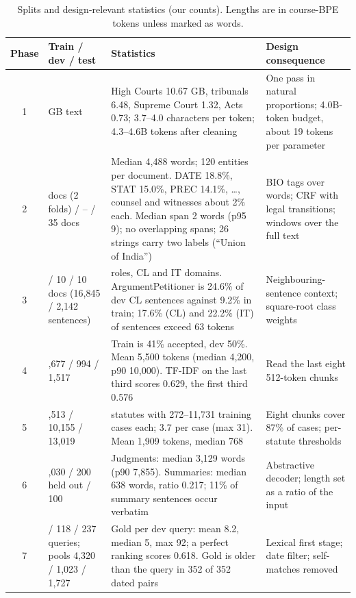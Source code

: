 \documentclass[11pt, oneside]{article}
\begin{document}
\begin{table}[H]
\centering\footnotesize
\setlength{\tabcolsep}{3pt}
\caption{Splits and design-relevant statistics (our counts). Lengths are in course-BPE tokens unless marked as words.}
\label{tab:data}
\begin{tabularx}{\textwidth}{c>{\raggedright\arraybackslash}p{3.1cm}>{\raggedright\arraybackslash}X>{\raggedright\arraybackslash}p{4.2cm}}
\toprule
Phase & Train / dev / test & Statistics & Design consequence \\
\midrule
1 & 19.2 GB text & High Courts 10.67 GB, tribunals 6.48, Supreme Court 1.32, Acts 0.73; 3.7--4.0 characters per token; 4.3--4.6B tokens after cleaning & One pass in natural proportions; 4.0B-token budget, about 19 tokens per parameter \\
2 & 70 docs (2 folds) / -- / 35 docs & Median 4,488 words; 120 entities per document. DATE 18.8\%, STAT 15.0\%, PREC 14.1\%, \dots, counsel and witnesses about 2\% each. Median span 2 words (p95 9); no overlapping spans; 26 strings carry two labels (``Union of India'') & BIO tags over words; CRF with legal transitions; windows over the full text \\
3 & 80 / 10 / 10 docs (16,845 / 2,142 sentences) & 13 roles, CL and IT domains. ArgumentPetitioner is 24.6\% of dev CL sentences against 9.2\% in train; 17.6\% (CL) and 22.2\% (IT) of sentences exceed 63 tokens & Neighbouring-sentence context; square-root class weights \\
4 & 31,677 / 994 / 1,517 & Train is 41\% accepted, dev 50\%. Mean 5,500 tokens (median 4,200, p90 10,000). TF-IDF on the last third scores 0.629, the first third 0.576 & Read the last eight 512-token chunks \\
5 & 42,513 / 10,155 / 13,019 & 100 statutes with 272--11,731 training cases each; 3.7 per case (max 31). Mean 1,909 tokens, median 768 & Eight chunks cover 87\% of cases; per-statute thresholds \\
6 & 7,030 / 200 held out / 100 & Judgments: median 3,129 words (p90 7,855). Summaries: median 638 words, ratio 0.217; 11\% of summary sentences occur verbatim & Abstractive decoder; length set as a ratio of the input \\
7 & 827 / 118 / 237 queries; pools 4,320 / 1,023 / 1,727 & Gold per dev query: mean 8.2, median 5, max 92; a perfect ranking scores 0.618. Gold is older than the query in 352 of 352 dated pairs & Lexical first stage; date filter; self-matches removed \\
\bottomrule
\end{tabularx}
\end{table}
\end{document}
